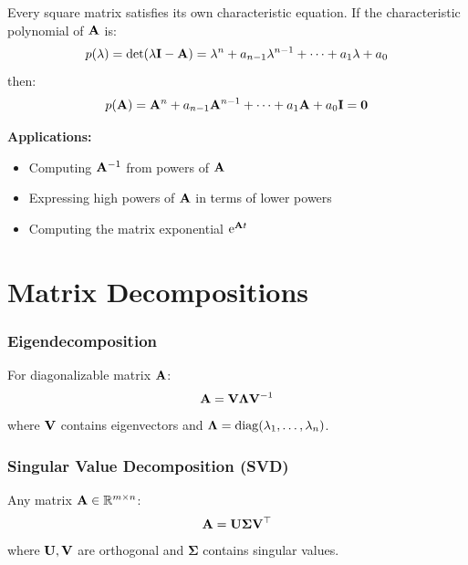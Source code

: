 \begin{keyconceptbox}[title=Cayley-Hamilton Theorem]
Every square matrix satisfies its own characteristic equation. If the characteristic polynomial of $\mathbf{A}$ is:
\[
p(\lambda) = \det(\lambda\mathbf{I} - \mathbf{A}) = \lambda^n + a_{n-1}\lambda^{n-1} + \cdots + a_1\lambda + a_0
\]
then:
\[
p(\mathbf{A}) = \mathbf{A}^n + a_{n-1}\mathbf{A}^{n-1} + \cdots + a_1\mathbf{A} + a_0\mathbf{I} = \mathbf{0}
\]

\textbf{Applications:}
\begin{itemize}
    \item Computing $\mathbf{A}^{-1}$ from powers of $\mathbf{A}$
    \item Expressing high powers of $\mathbf{A}$ in terms of lower powers
    \item Computing the matrix exponential $\mathrm{e}^{\mathbf{A} t}$
\end{itemize}
\end{keyconceptbox}

\section{Matrix Decompositions}

\subsubsection{Eigendecomposition}
For diagonalizable matrix $\mathbf{A}$:
\begin{equation}
\mathbf{A} = \mathbf{V}\boldsymbol{\Lambda}\mathbf{V}^{-1}
\end{equation}
where $\mathbf{V}$ contains eigenvectors and $\boldsymbol{\Lambda} = \operatorname{diag}(\lambda_1, \ldots, \lambda_n)$.

\subsubsection{Singular Value Decomposition (SVD)}
Any matrix $\mathbf{A} \in \mathbb{R}^{m \times n}$:
\begin{equation}
\mathbf{A} = \mathbf{U}\boldsymbol{\Sigma}\mathbf{V}^\top
\end{equation}
where $\mathbf{U}, \mathbf{V}$ are orthogonal and $\boldsymbol{\Sigma}$ contains singular values.

